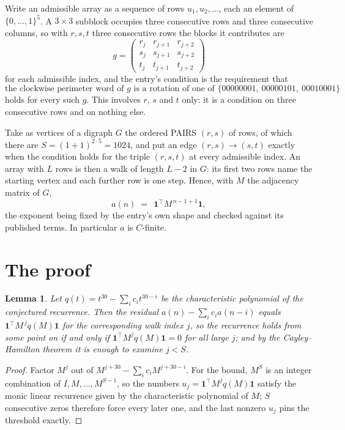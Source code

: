 \documentclass[11pt,a4paper]{article}
\theoremstyle{plain}
\newtheorem{lemma}[theorem]{Lemma}
\theoremstyle{definition}
\begin{document}
Write an admissible array as a sequence of rows $u_1,u_2,\dots$, each an element of
$\{0,\dots,1\}^{5}$. A $3\times3$ subblock occupies three consecutive rows and
three consecutive columns, so with $r,s,t$ three consecutive rows the blocks it
contributes are
\[
g=\begin{pmatrix}r_j&r_{j+1}&r_{j+2}\\ s_j&s_{j+1}&s_{j+2}\\ t_j&t_{j+1}&t_{j+2}\end{pmatrix}
\]
for each admissible index, and the entry's condition is the requirement that
\[
\text{the clockwise perimeter word of }g\text{ is a rotation of one of }\{00000001,\ 00000101,\ 00010001\}
\]
holds for every such $g$. This involves $r$, $s$ and $t$ only: it is a condition on
three consecutive rows and on nothing else.

Take as vertices of a digraph $G$ the ordered PAIRS $(r,s)$ of rows, of which there are
$S=(1+1)^{2\cdot5}=1024$, and put an edge $(r,s)\to(s,t)$ exactly when the condition
holds for the triple $(r,s,t)$ at every admissible index. An array with $L$ rows is then a
walk of length $L-2$ in $G$: its first two rows name the starting vertex and each further
row is one step. Hence, with $M$ the adjacency matrix of $G$,
\[
a(n)\;=\;\,\mathbf{1}^{\!\top}M^{\,n-1+1}\mathbf{1},
\]
the exponent being fixed by the entry's own shape and checked against its published terms.
In particular $a$ is $C$-finite.

\section{The proof}

\begin{lemma}\label{lem:crit}
Let $q(t)=t^{30}-\sum_i c_it^{30-i}$ be the characteristic polynomial of the
conjectured recurrence. Then the residual $a(n)-\sum_ic_ia(n-i)$ equals
$\mathbf{1}^{\!\top}M^{\,j}q(M)\mathbf{1}$ for the corresponding walk index
$j$, so the recurrence holds from some point on if and only if
$\mathbf{1}^{\!\top}M^{j}q(M)\mathbf{1}=0$ for all large $j$; and by the
Cayley--Hamilton theorem it is enough to examine $j<S$.
\end{lemma}

\begin{proof}
Factor $M^{j}$ out of $M^{j+30}-\sum_ic_iM^{j+30-i}$. For the bound, $M^{S}$
is an integer combination of $I,M,\dots,M^{S-1}$, so the numbers
$u_j=\mathbf{1}^{\!\top}M^{j}q(M)\mathbf{1}$ satisfy the monic linear recurrence given by
the characteristic polynomial of $M$; $S$ consecutive zeros therefore force every later one,
and the last nonzero $u_j$ pins the threshold exactly.
\end{proof}
\end{document}
